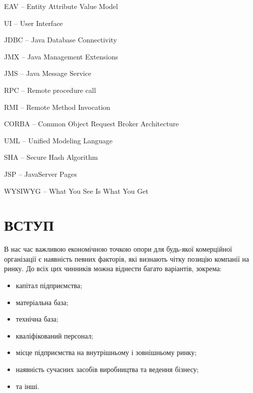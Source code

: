 \par EAV -- Entity Attribute Value Model 
\par UI -- User Interface
\par JDBC -- Java Database Connectivity
\par JMX -- Java Management Extensions
\par JMS -- Java Message Service
\par RPC -- Remote procedure call
\par RMI -- Remote Method Invocation
\par CORBA -- Common Object Request Broker Architecture

\par UML -- Unified Modeling Language
\par SHA -- Secure Hash Algorithm
\par JSP -- JavaServer Pages
 
\par WYSIWYG -- What You See Is What You Get


\section*{ВСТУП}
В нас час важливою економічною точкою опори для будь-якої комерційної організації є наявність певних факторів, які визнають чітку позицію компанії на ринку. До всіх цих чинників можна віднести багато варіантів, зокрема:
\begin{itemize}
\item капітал підприємства;
\item матеріальна база;
\item технічна база;
\item кваліфікований персонал;
\item місце підприємства на внутрішньому і зовнішньому ринку;
\item наявність сучасних засобів виробництва та ведення бізнесу;
\item та інші.
\end{itemize}

